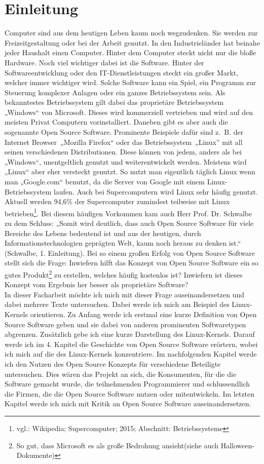 \documentclass[a4paper,12pt]{article}
\begin{document}
\section{Einleitung}
Computer sind aus dem heutigen Leben kaum noch wegzudenken. Sie werden zur Freizeitgestaltung oder bei der Arbeit genutzt. In den Industrieländer hat beinahe jeder Haushalt einen Computer. Hinter dem Computer steckt nicht nur die bloße Hardware. Noch viel wichtiger dabei ist die Software. Hinter der Softwareentwicklung oder den IT-Dienstleistungen steckt ein großer Markt, welcher immer wichtiger wird. Solche Software kann ein Spiel, ein Programm zur Steuerung komplexer Anlagen oder ein ganzes Betriebssystem sein. Als bekanntestes Betriebssystem gilt dabei das proprietäre Betriebssystem „Windows“ von Microsoft. Dieses wird kommerziell vertrieben und wird auf den meisten Privat Computern vorinstalliert. Daneben gibt es aber auch die sogenannte Open Source Software. Prominente Beispiele dafür sind z.~B. der Internet Browser~„Mozilla Firefox“ oder das Betriebssystem~„Linux” mit all seinen verschiedenen Distributionen. Diese können von jedem, anders als bei „Windows“, unentgeltlich genutzt und weiterentwickelt werden. Meistens wird „Linux“ aber eher versteckt genutzt. So nutzt man eigentlich täglich Linux wenn man „Google.com“ benutzt, da die Server von Google mit einem Linux-Betriebssystem laufen. Auch bei Supercomputern wird Linux sehr häufig genutzt. Aktuell werden 94,6\% der Supercomputer zumindest teilweise mit Linux betrieben\footnote{vgl.: Wikipedia; Supercomputer; 2015; Abschnitt: Betriebssysteme}. Bei diesem häufigen Vorkommen kam auch Herr Prof. Dr. Schwalbe zu dem Schluss: „Somit wird deutlich, dass auch Open Source Software für viele Bereiche des Lebens bedeutend ist und aus der heutigen, durch Informationstechnologien geprägten Welt, kaum noch heraus zu denken ist.“ (Schwalbe, 1. Einleitung). Bei so einem großen Erfolg von Open Source Software stellt sich die Frage: Inwiefern hilft das Konzept von Open Source Software ein so gutes Produkt\footnote{So gut, dass Microsoft es als große Bedrohung ansieht(siehe auch Halloween-Dokumente)} zu erstellen, welches häufig kostenlos ist? Inwiefern ist dieses Konzept vom Ergebnis her besser als proprietäre Software?\\
In dieser Facharbeit möchte ich mich mit dieser Frage auseinandersetzen und dabei mehrere Texte untersuchen. Dabei werde ich mich am Beispiel des Linux-Kernels orientieren. Zu Anfang werde ich erstmal eine kurze Definition von Open Source Software geben und sie dabei von anderen prominenten Softwaretypen abgrenzen. Zusätzlich gebe ich eine kurze Darstellung des Linux-Kernels. Darauf werde ich im 4. Kapitel die Geschichte von Open Source Software erörtern, wobei ich mich auf die des Linux-Kernels konzentriere. Im nachfolgenden Kapitel werde ich den Nutzen des Open Source Konzepts für verschiedene Beteiligte untersuchen. Dies wären das Projekt an sich, die Konsumenten, für die die Software gemacht wurde, die teilnehmenden Programmierer und schlussendlich die Firmen, die die Open Source Software nutzen oder mitentwickeln. Im letzten Kapitel werde ich mich mit Kritik an Open Source Software auseinandersetzen.
\end{document}
